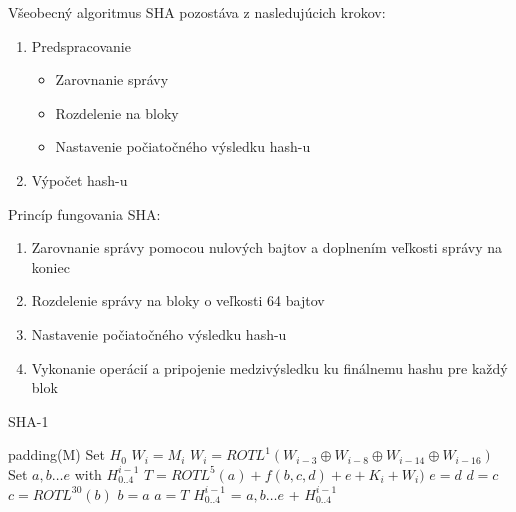 \documentclass[conference]{IEEEtran}
\begin{document}
Všeobecný algoritmus SHA pozostáva z nasledujúcich krokov:

\begin{enumerate}
	\item{Predspracovanie}
	\begin{itemize}
		\item{Zarovnanie správy}
		\item{Rozdelenie na bloky}
		\item{Nastavenie počiatočného výsledku hash-u}\\
	\end{itemize}
	\item{Výpočet hash-u}
\end{enumerate}

Princíp fungovania SHA: 
\begin{enumerate}
	\item{Zarovnanie správy pomocou nulových bajtov a doplnením veľkosti správy na koniec}
	\item{Rozdelenie správy na bloky o veľkosti 64 bajtov}
	\item{Nastavenie počiatočného výsledku hash-u}
	\item{Vykonanie operácií a pripojenie medzivýsledku ku finálnemu hashu pre každý blok}
\end{enumerate}

\begin{algorithm}
   \caption{SHA-1 \cite{sha-algo}}
    \begin{algorithmic}[1]

        \State padding(M) 
        \State  Set ${H_0}$ 
     	 
     			\State $W_i = M_i$
     		\EndFor
     			\State $W_i = ROTL^1(W_{i-3} \oplus W_{i-8} \oplus W_{i-14} \oplus W_{i-16})$
     		\EndFor
		\State Set ${a, b \ldots e}$ with ${H_{0..4}^{i-1}}$
		 
			\State  $T = ROTL^5(a) + f(b,c,d) + e + K_i + W_i)$
			\State  $e = d$
			\State  $d = c$
			\State  $c = ROTL^{30}(b)$
			\State  $b = a$
			\State  $a = T$
     		\EndFor		
     	\EndFor
   	\State ${H_{0..4}^{i-1}}$ = ${a, b \ldots e}$ + ${H_{0..4}^{i-1}}$
       \EndFunction
\end{algorithmic}
\end{algorithm}
\end{document}
